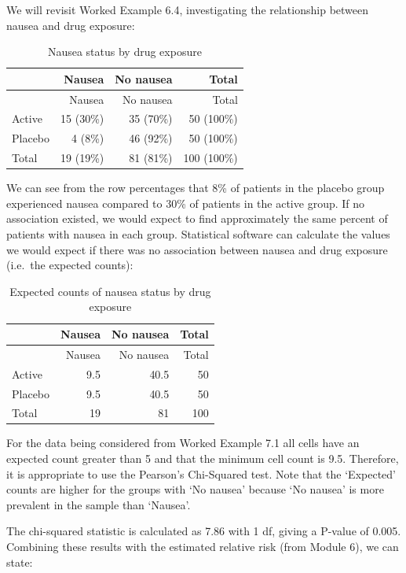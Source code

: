 \documentclass[
  a4paper,
]{memoir}
\begin{document}
We will revisit Worked Example 6.4, investigating the relationship
between nausea and drug exposure:

\begin{longtable}[]{@{}lrrr@{}}
\caption{Nausea status by drug
exposure}\label{tbl-rr-observed}\tabularnewline
\toprule\noalign{}
& Nausea & No nausea & Total \\
\midrule\noalign{}
\endfirsthead
\toprule\noalign{}
& Nausea & No nausea & Total \\
\midrule\noalign{}
\endhead
\bottomrule\noalign{}
\endlastfoot
Active & 15 (30\%) & 35 (70\%) & 50 (100\%) \\
Placebo & 4 (8\%) & 46 (92\%) & 50 (100\%) \\
Total & 19 (19\%) & 81 (81\%) & 100 (100\%) \\
\end{longtable}

We can see from the row percentages that 8\% of patients in the placebo
group experienced nausea compared to 30\% of patients in the active
group. If no association existed, we would expect to find approximately
the same percent of patients with nausea in each group. Statistical
software can calculate the values we would expect if there was no
association between nausea and drug exposure (i.e.~the expected counts):

\begin{longtable}[]{@{}lrrr@{}}
\caption{Expected counts of nausea status by drug
exposure}\label{tbl-rr-exp}\tabularnewline
\toprule\noalign{}
& Nausea & No nausea & Total \\
\midrule\noalign{}
\endfirsthead
\toprule\noalign{}
& Nausea & No nausea & Total \\
\midrule\noalign{}
\endhead
\bottomrule\noalign{}
\endlastfoot
Active & 9.5 & 40.5 & 50 \\
Placebo & 9.5 & 40.5 & 50 \\
Total & 19 & 81 & 100 \\
\end{longtable}

For the data being considered from Worked Example 7.1 all cells have an
expected count greater than 5 and that the minimum cell count is 9.5.
Therefore, it is appropriate to use the Pearson's Chi-Squared test. Note
that the `Expected' counts are higher for the groups with `No nausea'
because `No nausea' is more prevalent in the sample than `Nausea'.

The chi-squared statistic is calculated as 7.86 with 1 df, giving a
P-value of 0.005. Combining these results with the estimated relative
risk (from Module 6), we can state:
\end{document}
